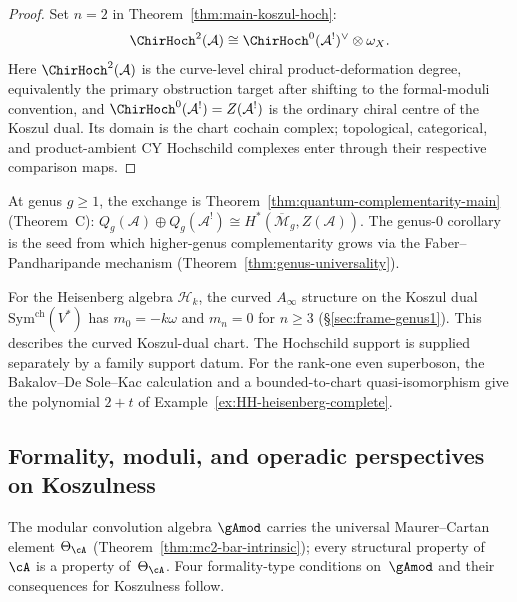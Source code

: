 \begin{proof}
Set $n = 2$ in Theorem~\ref{thm:main-koszul-hoch}:
\[
\ChirHoch^2(\mathcal{A})
\cong
\ChirHoch^{0}(\mathcal{A}^!)^\vee \otimes \omega_X .
\]
Here $\ChirHoch^2(\mathcal{A})$ is the curve-level chiral
product-deformation degree, equivalently the primary obstruction
target after shifting to the formal-moduli convention, and
$\ChirHoch^0(\mathcal{A}^!)=Z(\mathcal{A}^!)$ is the ordinary
chiral centre of the Koszul dual.  Its domain is the chart cochain
complex; topological, categorical, and product-ambient CY Hochschild
complexes enter through their respective comparison maps.
\end{proof}

\begin{remark}\label{rem:def-obs-higher-genus}
At genus $g \geq 1$, the exchange is Theorem~\ref{thm:quantum-complementarity-main} (Theorem~C): $Q_g(\mathcal{A}) \oplus Q_g(\mathcal{A}^!) \cong H^*(\overline{\mathcal{M}}_g, Z(\mathcal{A}))$. The genus-$0$ corollary is the seed from which higher-genus complementarity grows via the Faber--Pandharipande mechanism (Theorem~\ref{thm:genus-universality}).
\end{remark}

\begin{example}\label{ex:heisenberg-curved-specialization}
For the Heisenberg algebra $\mathcal{H}_k$, the curved
$A_\infty$ structure on the Koszul dual
$\mathrm{Sym}^{\mathrm{ch}}(V^*)$ has
$m_0=-k\omega$ and $m_n=0$ for $n\geq3$
(\S\ref{sec:frame-genus1}).  This describes the curved Koszul-dual
chart.  The Hochschild support is supplied separately by a family
support datum.  For the rank-one even superboson, the
Bakalov--De Sole--Kac calculation and a bounded-to-chart
quasi-isomorphism give the polynomial $2+t$ of
Example~\ref{ex:HH-heisenberg-complete}.
\end{example}



\subsection{Formality, moduli, and operadic perspectives on Koszulness}
\label{subsec:formality-moduli-operadic}

The modular
convolution algebra $\gAmod$ carries the universal Maurer--Cartan
element $\Theta_{\cA}$
(Theorem~\ref{thm:mc2-bar-intrinsic}); every structural property
of~$\cA$ is a property of~$\Theta_{\cA}$. Four
formality-type conditions on~$\gAmod$ and their consequences for
Koszulness follow.

